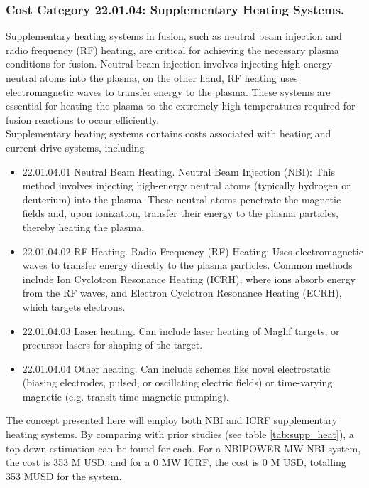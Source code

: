 \subsubsection*{Cost Category 22.01.04: Supplementary Heating Systems.}

Supplementary heating systems in fusion, such as neutral beam injection and radio frequency (RF) heating, are critical for achieving the necessary plasma conditions for fusion. Neutral beam injection involves injecting high-energy neutral atoms into the plasma, on the other hand, RF heating uses electromagnetic waves to transfer energy to the plasma. These systems are essential for heating the plasma to the extremely high temperatures required for fusion reactions to occur efficiently.\\

Supplementary heating systems contains costs associated with heating and current drive systems, including 

\begin{itemize}
    \item 22.01.04.01 Neutral Beam Heating.   Neutral Beam Injection (NBI): This method involves injecting high-energy neutral atoms (typically hydrogen or deuterium) into the plasma. These neutral atoms penetrate the magnetic fields and, upon ionization, transfer their energy to the plasma particles, thereby heating the plasma.
    \item 22.01.04.02 RF Heating.  Radio Frequency (RF) Heating: Uses electromagnetic waves to transfer energy directly to the plasma particles. Common methods include Ion Cyclotron Resonance Heating (ICRH), where ions absorb energy from the RF waves, and Electron Cyclotron Resonance Heating (ECRH), which targets electrons.
    \item 22.01.04.03 Laser heating.  Can include laser heating of Maglif targets, or precursor lasers for shaping of the target.
    \item 22.01.04.04 Other heating.  Can include schemes like novel electrostatic (biasing electrodes, pulsed, or oscillating electric fields) or time-varying magnetic (e.g. transit-time magnetic pumping).
\end{itemize}


The concept presented here will employ both NBI and ICRF supplementary heating systems. By comparing with prior studies (see table \ref{tab:supp_heat}), a top-down estimation can be found for each. For a NBIPOWER MW NBI system, the cost is 353 M USD, and for a 0 MW ICRF, the cost is 0 M USD, totalling 353 MUSD for the system.

